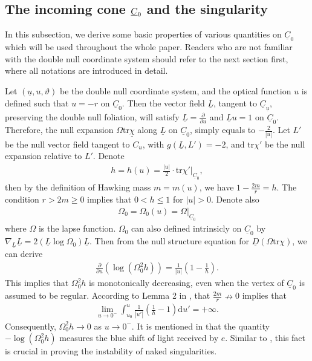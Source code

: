 \documentclass[11pt,reqno]{amsart}
\theoremstyle{definition}
\numberwithin{equation}{section}
\newcommand{\D}{\mathrm{d}}
\newcommand{\tr}{\mathrm{tr}}
\def\chib{\underline{\chi}}
\def\Lb{\underline{L}}
\def\tr{\mathrm{tr}}
\def\ub{\underline{u}}
\def\Cb{\underline{C}}
\newcommand{\Db}{\underline{D}}
\begin{document}
\subsection{The incoming cone $\uline{C}_0$ and the singularity} In this subsection, we derive some basic properties of various quantities on $\Cb_0$ which will be used throughout the whole paper. Readers who are not familiar with the double null coordinate system should refer to the next section first, where all notations are introduced in detail.

Let $(\ub,u,\vartheta)$ be the double null coordinate system, and the optical function $u$ is defined such that $u=-r$ on $\Cb_0$. Then the vector field $\Lb$, tangent to $\Cb_{\ub}$, preserving the double null foliation, will satisfy $\Lb=\frac{\partial}{\partial u}$ and $\Lb u=1$ on $\Cb_0$. Therefore, the null expansion $\Omega\tr\chib$ along $\Lb$ on $\Cb_0$, simply equals to $-\frac{2}{|u|}$. Let $L'$ be the null vector field tangent to $C_{u}$, with $g(\Lb,L')=-2$, and $\tr\chi'$ be the null expansion relative to $L'$. Denote
\begin{align*}
h=h(u)=\frac{|u|}{2}\cdot \tr\chi'\Big|_{\Cb_0},
\end{align*}
then by the definition of Hawking mass $m=m(u)$, we have $1-\frac{2m}{r}=h$. The condition $r>2m\ge0$ implies that $0<h\le1$ for $|u|>0$. Denote also 
\begin{align*}
\Omega_0=\Omega_0(u)=\Omega\Big|_{\Cb_0}
\end{align*}
where $\Omega$ is the lapse function. $\Omega_0$ can also defined intrinsicly on $\Cb_0$ by $\nabla_{\Lb}\Lb=2(\Lb\log\Omega_0)\Lb$. Then from the null structure equation for $\Db(\Omega\tr\chi)$, we can derive 
\begin{align}\label{equ-DbOmega02h}
\frac{\partial}{\partial u}\left(\log(\Omega_0^2h)\right)=\frac{1}{|u|}\left(1-\frac{1}{h}\right).
\end{align}
This implies that $\Omega_0^2h$ is monotonically decreasing, even when the vertex of $\Cb_0$ is assumed to be regular. According to Lemma 2 in \cite{Chr99}, that $\frac{2m}{r}\nrightarrow0$ implies that 
\begin{align*}
\lim_{u\to0^-}\int_{u_0}^u\frac{1}{|u'|}\left(\frac{1}{h}-1\right)\D u'=+\infty.
\end{align*}
Consequently, $\Omega_0^2h\to0$ as $u\to0^-$. It is mentioned in \cite{Chr99cqg} that the quantity $-\log(\Omega_0^2h)$ measures the blue shift of light received by $e$. Similar to \cite{Chr99}, this fact is crucial in proving the instability of naked singularities.
\end{document}
